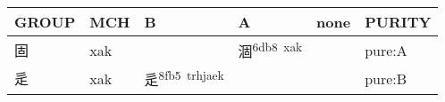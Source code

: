 \documentclass[14pt,a4paper]{scrartcl}
\begin{document}
\begin{longtable}[c]{@{}llllll@{}}
\toprule
\begin{minipage}[b]{0.14\columnwidth}\raggedright\strut
GROUP
\strut\end{minipage} &
\begin{minipage}[b]{0.14\columnwidth}\raggedright\strut
MCH
\strut\end{minipage} &
\begin{minipage}[b]{0.14\columnwidth}\raggedright\strut
B
\strut\end{minipage} &
\begin{minipage}[b]{0.14\columnwidth}\raggedright\strut
A
\strut\end{minipage} &
\begin{minipage}[b]{0.14\columnwidth}\raggedright\strut
none
\strut\end{minipage} &
\begin{minipage}[b]{0.14\columnwidth}\raggedright\strut
PURITY
\strut\end{minipage}\tabularnewline
\midrule
\endhead
\begin{minipage}[t]{0.14\columnwidth}\raggedright\strut
固
\strut\end{minipage} &
\begin{minipage}[t]{0.14\columnwidth}\raggedright\strut
xak
\strut\end{minipage} &
\begin{minipage}[t]{0.14\columnwidth}\raggedright\strut
\strut\end{minipage} &
\begin{minipage}[t]{0.14\columnwidth}\raggedright\strut
涸\textsuperscript{6db8~xak}
\strut\end{minipage} &
\begin{minipage}[t]{0.14\columnwidth}\raggedright\strut
\strut\end{minipage} &
\begin{minipage}[t]{0.14\columnwidth}\raggedright\strut
pure:A
\strut\end{minipage}\tabularnewline
\begin{minipage}[t]{0.14\columnwidth}\raggedright\strut
辵
\strut\end{minipage} &
\begin{minipage}[t]{0.14\columnwidth}\raggedright\strut
xak
\strut\end{minipage} &
\begin{minipage}[t]{0.14\columnwidth}\raggedright\strut
辵\textsuperscript{8fb5~trhjaek}
\strut\end{minipage} &
\begin{minipage}[t]{0.14\columnwidth}\raggedright\strut
\strut\end{minipage} &
\begin{minipage}[t]{0.14\columnwidth}\raggedright\strut
\strut\end{minipage} &
\begin{minipage}[t]{0.14\columnwidth}\raggedright\strut
pure:B
\strut\end{minipage}\tabularnewline
\bottomrule
\end{longtable}
\end{document}
